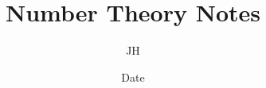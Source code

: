 \documentclass{book}
\newcommand{\<}{\langle}
\renewcommand{\>}{\rangle}
\theoremstyle{definitionstyle}
\theoremstyle{exercisestyle}
\theoremstyle{remarkstyle}
\begin{document}
\title{Number Theory Notes}
\author{JH}
\date{Date}
\maketitle

\tableofcontents



\end{document}
